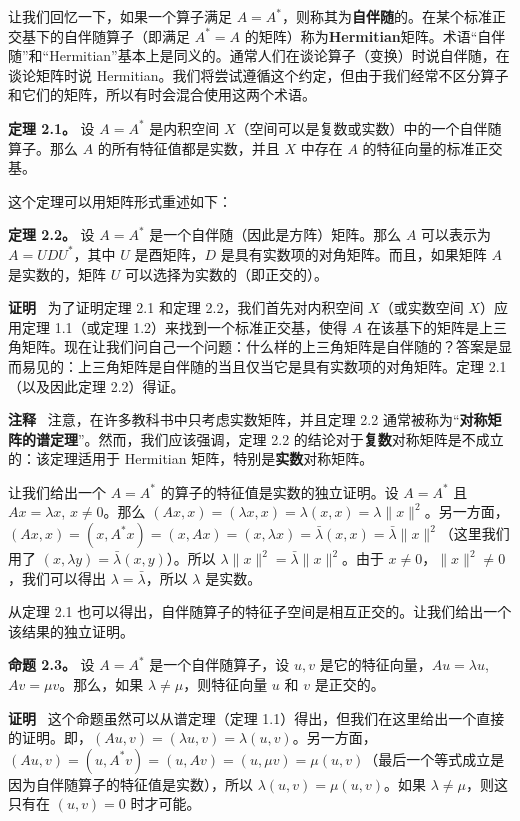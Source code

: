 让我们回忆一下，如果一个算子满足 $A = A^*$，则称其为\textbf{自伴随}的。在某个标准正交基下的自伴随算子（即满足 $A^* = A$ 的矩阵）称为\textbf{Hermitian}矩阵。术语“自伴随”和“Hermitian”基本上是同义的。通常人们在谈论算子（变换）时说自伴随，在谈论矩阵时说 Hermitian。我们将尝试遵循这个约定，但由于我们经常不区分算子和它们的矩阵，所以有时会混合使用这两个术语。

\textbf{定理 2.1。} 设 $A = A^*$ 是内积空间 $X$（空间可以是复数或实数）中的一个自伴随算子。那么 $A$ 的所有特征值都是实数，并且 $X$ 中存在 $A$ 的特征向量的标准正交基。

这个定理可以用矩阵形式重述如下：

\textbf{定理 2.2。} 设 $A = A^*$ 是一个自伴随（因此是方阵）矩阵。那么 $A$ 可以表示为 $A = UDU^*$，其中 $U$ 是酉矩阵，$D$ 是具有实数项的对角矩阵。而且，如果矩阵 $A$ 是实数的，矩阵 $U$ 可以选择为实数的（即正交的）。

\textbf{证明}~ 为了证明定理 2.1 和定理 2.2，我们首先对内积空间 $X$（或实数空间 $X$）应用定理 1.1（或定理 1.2）来找到一个标准正交基，使得 $A$ 在该基下的矩阵是上三角矩阵。现在让我们问自己一个问题：什么样的上三角矩阵是自伴随的？答案是显而易见的：上三角矩阵是自伴随的当且仅当它是具有实数项的对角矩阵。定理 2.1（以及因此定理 2.2）得证。

\textbf{注释} ~注意，在许多教科书中只考虑实数矩阵，并且定理 2.2 通常被称为“\textbf{对称矩阵的谱定理}”。然而，我们应该强调，定理 2.2 的结论对于\textbf{复数}对称矩阵是不成立的：该定理适用于 Hermitian 矩阵，特别是\textbf{实数}对称矩阵。

让我们给出一个 $A=A^*$ 的算子的特征值是实数的独立证明。设 $A=A^*$ 且 $Ax=\lambda x$, $x \neq 0$。那么 $(Ax, x) = (\lambda x, x) = \lambda(x, x) = \lambda\|x\|^2$。另一方面，$(Ax, x) = (x, A^*x) = (x, Ax) = (x, \lambda x) = \bar{\lambda}(x, x) = \bar{\lambda}\|x\|^2$（这里我们用了 $(x, \lambda y) = \bar{\lambda}(x, y)$）。所以 $\lambda\|x\|^2 = \bar{\lambda}\|x\|^2$。由于 $x \neq 0$，$\|x\|^2 \neq 0$，我们可以得出 $\lambda = \bar{\lambda}$，所以 $\lambda$ 是实数。

从定理 2.1 也可以得出，自伴随算子的特征子空间是相互正交的。让我们给出一个该结果的独立证明。

\textbf{命题 2.3。} 设 $A = A^*$ 是一个自伴随算子，设 $u, v$ 是它的特征向量，$Au = \lambda u$, $Av = \mu v$。那么，如果 $\lambda \neq \mu$，则特征向量 $u$ 和 $v$ 是正交的。

\textbf{证明}~ 这个命题虽然可以从谱定理（定理 1.1）得出，但我们在这里给出一个直接的证明。即，$(Au, v) = (\lambda u, v) = \lambda(u, v)$。另一方面，$(Au, v) = (u, A^*v) = (u, Av) = (u, \mu v) = \mu(u, v)$（最后一个等式成立是因为自伴随算子的特征值是实数），所以 $\lambda(u, v) = \mu(u, v)$。如果 $\lambda \neq \mu$，则这只有在 $(u, v) = 0$ 时才可能。

